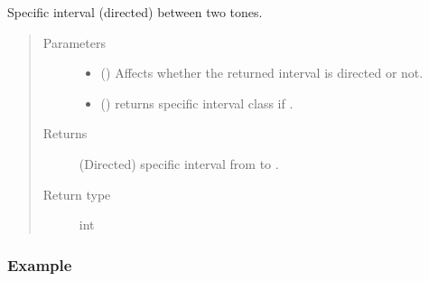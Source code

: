 \documentclass[letterpaper,10pt,english]{sphinxmanual}
\begin{document}
\begin{fulllineitems}
\begin{fulllineitems}
\sphinxAtStartPar
Specific interval (directed) between two tones.
\begin{quote}\begin{description}
\item[{Parameters}] \leavevmode\begin{itemize}
\item {} 
\sphinxAtStartPar
{} () \textendash{} Affects whether the returned interval is directed or not.

\item {} 
\sphinxAtStartPar
{} () \textendash{} returns specific interval class if .

\end{itemize}

\item[{Returns}] \leavevmode
\sphinxAtStartPar
(Directed) specific interval from  to .

\item[{Return type}] \leavevmode
\sphinxAtStartPar
int

\end{description}\end{quote}
\subsubsection*{Example}

\begin{sphinxVerbatim}[commandchars=\\\{\}]
   
   
   
\end{sphinxVerbatim}


\end{fulllineitems}
\end{fulllineitems}
\end{document}
